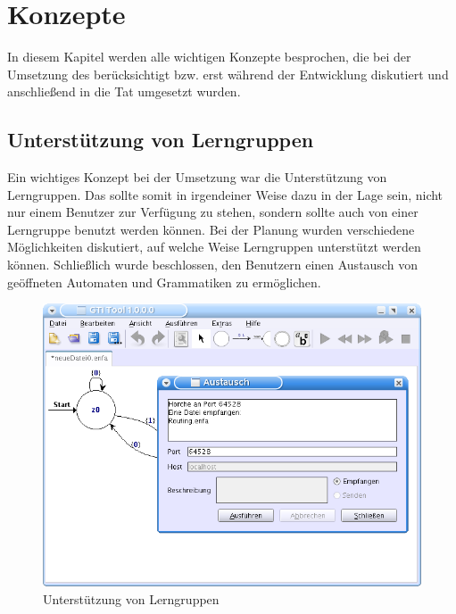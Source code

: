 

\chapter{Konzepte}\label{Concepts}

In diesem Kapitel werden alle wichtigen Konzepte besprochen, die bei der
Umsetzung des \gtitools berücksichtigt bzw. erst während der Entwicklung
diskutiert und anschließend in die Tat umgesetzt wurden.\vspace{10pt}


\section{Unterstützung von Lerngruppen}\label{ConceptsLerning}

Ein wichtiges Konzept bei der Umsetzung war die Unterstützung von Lerngruppen.
Das \gtitool sollte somit in irgendeiner Weise dazu in der Lage sein, nicht nur
einem Benutzer zur Verfügung zu stehen, sondern sollte auch von einer
Lerngruppe benutzt werden können. Bei der Planung wurden verschiedene
Möglichkeiten diskutiert, auf welche Weise Lerngruppen unterstützt werden
können. Schließlich wurde beschlossen, den Benutzern einen Austausch von
geöffneten Automaten und Grammatiken zu ermöglichen.\vspace{10pt}

\begin{figure}[h!]
\begin{center}
\includegraphics[width=12cm]{../images/exchange.png}
\caption{Unterstützung von Lerngruppen}
\end{center}
\end{figure}
\vspace{10pt}

